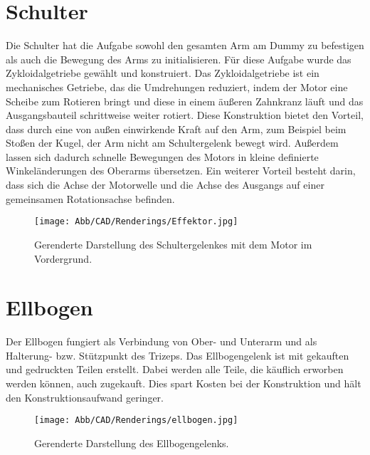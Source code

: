 	\section{Schulter}
		Die Schulter hat die Aufgabe sowohl den gesamten Arm am Dummy zu befestigen als auch die Bewegung des Arms zu initialisieren.
		Für diese Aufgabe wurde das Zykloidalgetriebe gewählt und konstruiert.
		Das Zykloidalgetriebe ist ein mechanisches Getriebe, das die Umdrehungen reduziert, indem der Motor eine Scheibe zum Rotieren bringt und diese in einem äußeren Zahnkranz läuft und das Ausgangsbauteil schrittweise weiter rotiert.
		Diese Konstruktion bietet den Vorteil, dass durch eine von außen einwirkende Kraft auf den Arm, zum Beispiel beim Stoßen der Kugel, der Arm nicht am Schultergelenk bewegt wird.
		Außerdem lassen sich dadurch schnelle Bewegungen des Motors in kleine definierte Winkeländerungen des Oberarms übersetzen.
		Ein weiterer Vorteil besteht darin, dass sich die Achse der Motorwelle und die Achse des Ausgangs auf einer gemeinsamen Rotationsachse befinden.
		\begin{figure}[h]
			\centering
			\texttt{[image: Abb/CAD/Renderings/Effektor.jpg]}
			\caption[Gerenderte Darstellung des Schultergelenkes]{Gerenderte Darstellung des Schultergelenkes mit dem Motor im Vordergrund.}%
			\label{fig:rendering effektor}
		\end{figure}

	
	\section{Ellbogen}
		Der Ellbogen fungiert als Verbindung von Ober- und Unterarm und als Halterung- bzw. Stützpunkt des Trizeps.
		Das Ellbogengelenk ist mit gekauften und gedruckten Teilen erstellt.
		Dabei werden alle Teile, die käuflich erworben werden können, auch zugekauft.
		Dies spart Kosten bei der Konstruktion und hält den Konstruktionsaufwand geringer.
		\begin{figure}[h]
			\centering
			\texttt{[image: Abb/CAD/Renderings/ellbogen.jpg]}
			\caption[Gerenderte Darstellung des Ellbogengelenks]{Gerenderte Darstellung des Ellbogengelenks.}%
			\label{fig:rendering ellbogen}
		\end{figure}
	
